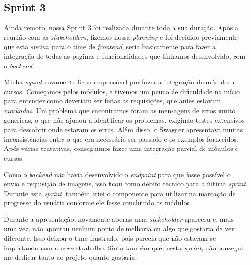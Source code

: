 \subsection{Sprint 3}

Ainda remoto, nossa Sprint 3 foi realizada durante toda a sua duração. Após a reunião com as \textit{stakeholders}, fizemos nossa \textit{planning} e foi decidido previamente que esta \textit{sprint}, para o time de \textit{frontend}, seria basicamente para fazer a integração de todas as páginas e funcionalidades que tínhamos desenvolvido, com o \textit{backend}.

Minha \textit{squad} novamente ficou responsável por fazer a integração de módulos e cursos. Começamos pelos módulos, e tivemos um pouco de dificuldade no início para entender como deveriam ser feitas as requisições, que antes estavam \textit{mockadas}. Um problema que encontramos foram as mensagens de erros muito genéricas, o que não ajudou a identificar os problemas, exigindo testes extensivos para descobrir onde estavam os erros. Além disso, o Swagger apresentava muitas inconsistências entre o que era necessário ser passado e os exemplos fornecidos. Após várias tentativas, conseguimos fazer uma integração parcial de módulos e cursos.

Como o \textit{backend} não havia desenvolvido o \textit{endpoint} para que fosse possível o envio e requisição de imagens, isso ficou como débito técnico para a última \textit{sprint}. Durante esta \textit{sprint}, também criei o componente para utilizar na marcação de progresso do usuário conforme ele fosse concluindo os módulos.

Durante a apresentação, novamente apenas uma \textit{stakeholder} apareceu e, mais uma vez, não apontou nenhum ponto de melhoria ou algo que gostaria de ver diferente. Isso deixou o time frustrado, pois parecia que não estavam se importando com o nosso trabalho. Sinto também que, nesta \textit{sprint}, não consegui me dedicar tanto ao projeto quanto gostaria.